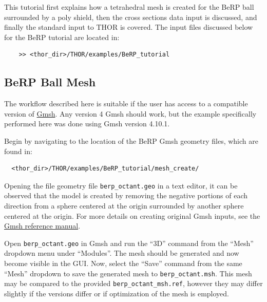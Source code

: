 This tutorial first explains how a tetrahedral mesh is created for the BeRP ball surrounded by a poly shield, then the cross sections data input is discussed, and finally the standard input to THOR is covered.
The input files discussed below for the BeRP tutorial are located in:
\begin{verbatim}
    >> <thor_dir>/THOR/examples/BeRP_tutorial
\end{verbatim}

\subsection{BeRP Ball Mesh}\label{ch:tuts:sec:berp:ssec:mesh}

The workflow described here is suitable if the user has access to a compatible version of \href{https://gmsh.info/}{Gmsh}.
Any version 4 Gmsh should work, but the example specifically performed here was done using Gmsh version 4.10.1.

Begin by navigating to the location of the BeRP Gmsh geometry files, which are found in:
\begin{verbatim}
  <thor_dir>/THOR/examples/BeRP_tutorial/mesh_create/
\end{verbatim}
Opening the file geometry file \verb"berp_octant.geo" in a text editor, it can be observed that the model is created by removing the negative portions of each direction from a sphere centered at the origin surrounded by another sphere centered at the origin.
For more details on creating original Gmsh inputs, see the \href{https://gmsh.info/doc/texinfo/gmsh.html}{Gmsh reference manual}.

Open \verb"berp_octant.geo" in Gmsh and run the ``3D'' command from the ``Mesh'' dropdown menu under ``Modules''.
The mesh should be generated and now become visible in the \ac{GUI}.
Now, select the ``Save'' command from the same ``Mesh'' dropdown to save the generated mesh to \verb"berp_octant.msh".
This mesh may be compared to the provided \verb"berp_octant_msh.ref", however they may differ slightly if the versions differ or if optimization of the mesh is employed.

